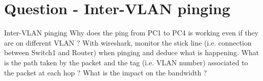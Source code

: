 \section{Question - Inter-VLAN pinging}

\begin{questionBox}{Inter-VLAN pinging}
    Why does the ping from PC1 to PC4 is working even if they are on different VLAN ? With wireshark, monitor the stick line (i.e. connection between Switch1 and Router) when pinging and deduce what is happening. What is the path taken by the packet and the tag (i.e. VLAN number) associated to the packet at each hop ? What is the impact on the bandwidth ?
\end{questionBox}
